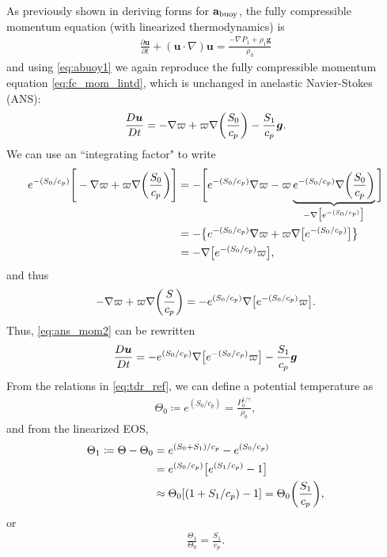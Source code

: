 \documentclass[12pt]{article} %
\newcommand{\pderiv}[2]{\frac{\partial#1}{\partial#2}}
\newcommand{\pomega}{\varpi}
\newcommand{\ugrad}{\bm{u}\cdot\nabla}
\begin{document}
	As previously shown in deriving forms for $\mathbf{a}_{\rm{buoy}}$, the fully compressible momentum equation (with linearized thermodynamics) is
	\begin{align}
	\pderiv{\bm{u}}{t}+(\ugrad)\bm{u}=\frac{-\nabla P_1 + \rho_1\bm{g}}{\rho_0}
	\label{eq:ans_mom}
	\end{align}
	and using \eqref{eq:abuoy1} we again reproduce the fully compressible momentum equation \eqref{eq:fc_mom_lintd}, which is unchanged in anelastic Navier-Stokes (ANS):
		\begin{align}
	\frac{D\bm{u}}{Dt} = -\nabla\pomega + \pomega\nabla\bigg{(}\frac{S_0}{c_p}\bigg{)} - \frac{S_1}{c_p}\bm{g}.
	\label{eq:ans_mom2}
	\end{align}
	We can use an ``integrating factor" to write
	\begin{align*}
	e^{-(S_0/c_p)}\Bigg{[}-\nabla\pomega+\pomega\nabla\bigg{(}\frac{S_0}{c_p}\bigg{)}\Bigg{]}&= -\Bigg{[}e^{-(S_0/c_p)}\nabla\pomega - \pomega \underbrace{e^{-(S_0/c_p)}\nabla\bigg{(}\frac{S_0}{c_p}\bigg{)}}_{-\nabla\big{[} e^{-(S_0/c_p)}\big{]}}\Bigg{]}\\
	&= -\big{\{}e^{-(S_0/c_p)}\nabla\pomega + \pomega\nabla\big{[} e^{-(S_0/c_p)}\big{]}\big{\}}\\
	&= -\nabla\big{[}e^{-(S_0/c_p)}\pomega\big{]},
	\end{align*}
	and thus
	\begin{align*}
 -\nabla\pomega+\pomega\nabla\bigg{(}\frac{S}{c_p}\bigg{)}
 =  -e^{(S_0/c_p)}\nabla\big{[}e^{-(S_0/c_p)}\pomega\big{]}.
	\end{align*}
	Thus, \eqref{eq:ans_mom2} can be rewritten
	\begin{align}
	\frac{D\bm{u}}{Dt}=-e^{(S_0/c_p)}\nabla\big{[}e^{-(S_0/c_p)}\pomega\big{]}
	- \frac{S_1}{c_p}\bm{g}
	\label{eq:ans_mom3}
	\end{align}
	From the relations in \eqref{eq:tdr_ref}, we can define a potential temperature as
	\begin{align}
	\Theta_0\coloneqq e^{(S_0/c_p)} = \frac{P_0^{1/\gamma}}{\rho_0},
	\end{align}
	and from the linearized EOS,
	\begin{align*}
	\Theta_1 \coloneqq \Theta-\Theta_0 &= e^{(S_0+S_1)/c_p}-e^{(S_0/c_p)}\\
	&= e^{(S_0/c_p)}\big{[}e^{(S_1/c_p)}-1\big{]}\\
	&\approx \Theta_0[(1+S_1/c_p) - 1] = \Theta_0\bigg{(}\frac{S_1}{c_p}\bigg{)},
	\end{align*}
	or
	\begin{align}
	\frac{\Theta_1}{\Theta_0}=\frac{S_1}{c_p}.
	\end{align}
\end{document}
